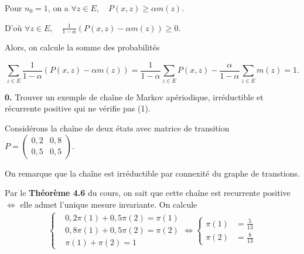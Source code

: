 \documentclass[french]{article}
\begin{document}
	Pour $n_0 = 1$, on a $\forall z \in E, \quad P(x,z) \geq \alpha m(z)$.
	
	D'où $\forall z \in E, \quad \frac{1}{1-\alpha}\left(P(x, z) - \alpha m(z)\right) \geq 0$.
	
	Alors, on calcule la somme des probabilités
	
	$$ \sum_{z \in E} \frac{1}{1-\alpha}\left(P(x, z) - \alpha m(z)\right) = \frac{1}{1 - \alpha} \sum_{z \in E} P(x, z) - \frac{\alpha}{1 - \alpha} \sum_{z \in E} m(z) = 1.$$
	
	\begin{tcolorbox}[colback=gray!5!white,colframe=gray!75!black]
		\textbf{0.} Trouver un exemple de chaîne de Markov apériodique, irréductible et récurrente positive qui ne vérifie pas (1).
	\end{tcolorbox}
	
	Considérons la chaîne de deux états avec matrice de transition $P = \begin{pmatrix}
	0,2 & 0,8 \\
	0,5 & 0,5
	\end{pmatrix}.$
	
	\begin{center}
	\end{center}

	On remarque que la chaîne est irréductible par connexité du graphe de transtions. 
	
	Par le \textbf{Théorème 4.6} du cours, on sait que cette chaîne est recurrente positive $\iff$ elle admet l'unique mesure invariante. On calcule
	\begin{align}
	\begin{cases}
		&0,2 \pi(1) + 0,5 \pi(2) = \pi(1)\\
		&0,8 \pi(1) + 0,5\pi(2) = \pi(2)\\
		&\pi(1) + \pi(2) = 1
	\end{cases}
	\iff \begin{cases}
	\pi(1) &= \frac{5}{13}\\
	\pi(2) &= \frac{8}{13}
	\end{cases}
	\end{align}
\end{document}
